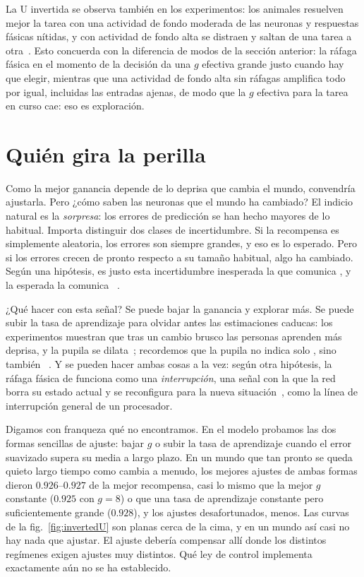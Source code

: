 La U invertida se observa también en los experimentos: los animales resuelven mejor la tarea con una actividad de fondo moderada de las neuronas  y respuestas fásicas nítidas, y con actividad de fondo alta se distraen y saltan de una tarea a otra~\cite{AstonJones2005}. Esto concuerda con la diferencia de modos de la sección anterior: la ráfaga fásica en el momento de la decisión da una $g$ efectiva grande justo cuando hay que elegir, mientras que una actividad de fondo alta sin ráfagas amplifica todo por igual, incluidas las entradas ajenas, de modo que la $g$ efectiva para la tarea en curso cae: eso es exploración.

\section{Quién gira la perilla}

Como la mejor ganancia depende de lo deprisa que cambia el mundo, convendría ajustarla. Pero ¿cómo saben las neuronas  que el mundo ha cambiado? El indicio natural es la \emph{sorpresa}: los errores de predicción se han hecho mayores de lo habitual. Importa distinguir dos clases de incertidumbre. Si la recompensa es simplemente aleatoria, los errores son siempre grandes, y eso es lo esperado. Pero si los errores crecen de pronto respecto a su tamaño habitual, algo ha cambiado. Según una hipótesis, es justo esta incertidumbre inesperada la que comunica , y la esperada la comunica ~\cite{YuDayan2005}.

¿Qué hacer con esta señal? Se puede bajar la ganancia y explorar más. Se puede subir la tasa de aprendizaje para olvidar antes las estimaciones caducas: los experimentos muestran que tras un cambio brusco las personas aprenden más deprisa, y la pupila se dilata~\cite{Nassar2012}; recordemos que la pupila no indica solo , sino también ~\cite{Reimer2016}. Y se pueden hacer ambas cosas a la vez: según otra hipótesis, la ráfaga fásica de  funciona como una \emph{interrupción}, una señal con la que la red borra su estado actual y se reconfigura para la nueva situación~\cite{BouretSara2005}, como la línea de interrupción general de un procesador.

Digamos con franqueza qué no encontramos. En el modelo probamos las dos formas sencillas de ajuste: bajar $g$ o subir la tasa de aprendizaje cuando el error suavizado supera su media a largo plazo. En un mundo que tan pronto se queda quieto largo tiempo como cambia a menudo, los mejores ajustes de ambas formas dieron $0.926$--$0.927$ de la mejor recompensa, casi lo mismo que la mejor $g$ constante ($0.925$ con $g=8$) o que una tasa de aprendizaje constante pero suficientemente grande ($0.928$), y los ajustes desafortunados, menos. Las curvas de la fig.~\ref{fig:invertedU} son planas cerca de la cima, y en un mundo así casi no hay nada que ajustar. El ajuste debería compensar allí donde los distintos regímenes exigen ajustes muy distintos. Qué ley de control implementa exactamente  aún no se ha establecido.

